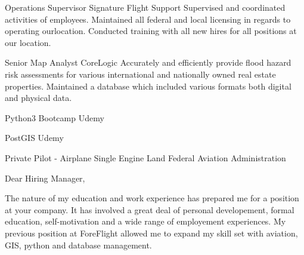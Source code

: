 \documentclass[letterpaper]{ReadableCV}
\begin{document}
{Operations Supervisor}
{Signature Flight Support}
{Supervised and coordinated activities of employees. Maintained all federal and local licensing in regards to operating ourlocation. Conducted training with all new hires for all positions at our location.}


{Senior Map Analyst}
{CoreLogic}
{Accurately and efficiently provide flood hazard risk assessments for various international and nationally owned real estate properties. Maintained a database which included various formats both digital and physical data.}



{Python3 Bootcamp}
{Udemy}{}

{PostGIS}
{Udemy}{}

{Private Pilot - Airplane Single Engine Land}
{Federal Aviation Administration}{}

         
          
\clearpage
 
 
\showHeader




\makeLetter

Dear Hiring Manager,

\bigskip

The nature of my education and work experience has prepared me for a position at your company. It has involved a great deal of personal developement, formal education, self-motivation and a wide range of employement experiences. My previous position at ForeFlight allowed me to expand my skill set with aviation, GIS, python and database management. 
\end{document}
